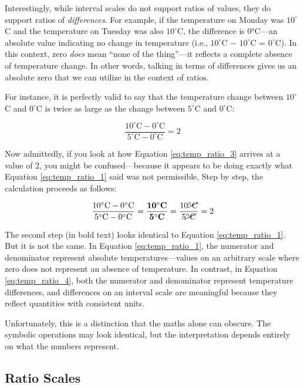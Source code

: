 Interestingly, while interval scales do not support ratios of values, they do support ratios of \textit{differences}. For example, if the temperature on Monday was $10^\circ$C and the temperature on Tuesday was also $10^\circ$C, the difference is 0°C—an absolute value indicating no change in temperature (i.e., $10^\circ$C − $10^\circ$C = $0^\circ$C). In this context, zero \textit{does} mean ``none of the thing''—it reflects a complete absence of temperature change. In other words, talking in terms of differences gives us an absolute zero that we can utilize in the context of ratios. 

For instance, it is perfectly valid to say that the temperature change between $10^\circ$C and $0^\circ$C is twice as large as the change between $5^\circ$C and $0^\circ$C:

\begin{equation}
\frac{10^\circ \text{C} - 0^\circ \text{C}}{5^\circ \text{C} - 0^\circ \text{C}} = 2
\label{eq:temp_ratio_3}
\end{equation}

Now admittedly, if you look at how Equation \ref{eq:temp_ratio_3} arrives at a value of 2, you might be confused—because it appears to be doing exactly what Equation \ref{eq:temp_ratio_1} said was not permissible. Step by step, the calculation proceeds as follows:

\begin{equation}
\frac{10^\circ \text{C} - 0^\circ \text{C}}{5^\circ \text{C} - 0^\circ \text{C}} = \mathbf{\frac{10^\circ \textbf{C}}{5^\circ \textbf{C}}} = \frac{10\cancel{^\circ \text{C}}}{5\cancel{^\circ \text{C}}} = 2
\label{eq:temp_ratio_4}
\end{equation}

The second step (in bold text) looks identical to Equation \ref{eq:temp_ratio_1}. But it is not the same. In Equation \ref{eq:temp_ratio_1}, the numerator and denominator represent absolute temperatures—values on an arbitrary scale where zero does not represent an absence of temperature. In contrast, in Equation \ref{eq:temp_ratio_4}, both the numerator and denominator represent temperature differences, and differences on an interval scale are meaningful because they reflect quantities with consistent units.

Unfortunately, this is a distinction that the maths alone can obscure. The symbolic operations may look identical, but the interpretation depends entirely on what the numbers represent.

\subsection{Ratio Scales}

